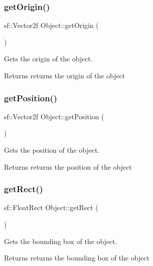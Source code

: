 \subsubsection{\texorpdfstring{get\+Origin()}{getOrigin()}}
{\footnotesize\ttfamily sf\+::\+Vector2f Object\+::get\+Origin (\begin{DoxyParamCaption}{ }\end{DoxyParamCaption})}



Gets the origin of the object. 

\begin{DoxyReturn}{Returns}
returns the origin of the object 
\end{DoxyReturn}
\mbox{\label{class_object_aca7577fe05441fa619aad2b71ac8df8c}} 
\subsubsection{\texorpdfstring{get\+Position()}{getPosition()}}
{\footnotesize\ttfamily sf\+::\+Vector2f Object\+::get\+Position (\begin{DoxyParamCaption}{ }\end{DoxyParamCaption})}



Gets the position of the object. 

\begin{DoxyReturn}{Returns}
returns the position of the object 
\end{DoxyReturn}
\mbox{\label{class_object_a9aae1a5a5a7365183937527a31cd2e46}} 
\subsubsection{\texorpdfstring{get\+Rect()}{getRect()}}
{\footnotesize\ttfamily sf\+::\+Float\+Rect Object\+::get\+Rect (\begin{DoxyParamCaption}{ }\end{DoxyParamCaption})}



Gets the bounding box of the object. 

\begin{DoxyReturn}{Returns}
returns the bounding box of the object 
\end{DoxyReturn}
\mbox{\label{class_object_a582b0987634413023fdf6d93f7cfca36}} 
